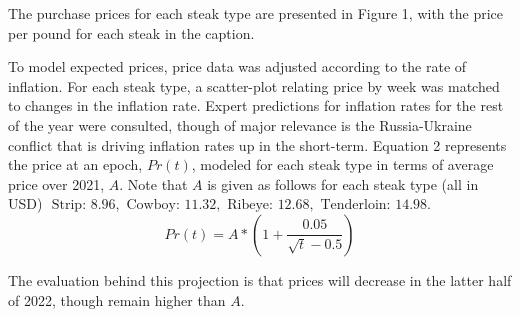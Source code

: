 \documentclass[12pt,a4paper]{article}
\begin{document}
The purchase prices for each steak type are presented in Figure 1, with the price per pound for each steak in the caption.

To model expected prices, price data was adjusted according to the rate of inflation. For each steak type, a scatter-plot relating price by week was matched to changes in the inflation rate. Expert predictions for inflation rates for the rest of the year were consulted, though of major relevance is the Russia-Ukraine conflict that is driving inflation rates up in the short-term. Equation 2 represents the price at an epoch, $Pr(t)$, modeled for each steak type in terms of average price over 2021, $A$. 
Note that $A$ is given as follows for each steak type (all in USD) $\text{ Strip: } 8.96, \text{ Cowboy: } 11.32,$ $\text{Ribeye: } 12.68, \text{ Tenderloin: } 14.98.$
\\

\begin{equation} \label{2}
Pr(t) = A * (1 + \frac{0.05}{\sqrt{t} - 0.5}) 
\end{equation}

The evaluation behind this projection is that prices will decrease in the latter half of 2022, though remain higher than $A$. 

\newpage
\end{document}
